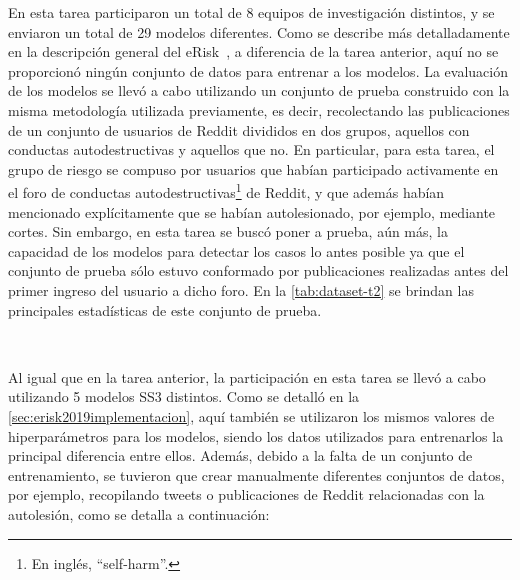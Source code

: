 En esta tarea participaron un total de 8 equipos de investigación distintos, y se enviaron un total de 29 modelos diferentes.
Como se describe más detalladamente en la descripción general del eRisk~\cite{losadaetal2019}, a diferencia de la tarea anterior, aquí no se proporcionó ningún conjunto de datos para entrenar a los modelos.
La evaluación de los modelos se llevó a cabo utilizando un conjunto de prueba construido con la misma metodología utilizada previamente, es decir, recolectando las publicaciones de un conjunto de usuarios de Reddit divididos en dos grupos, aquellos con conductas autodestructivas y aquellos que no.
En particular, para esta tarea, el grupo de riesgo se compuso por usuarios que habían participado activamente en el foro de conductas autodestructivas\footnote{En inglés, ``self-harm''.} de Reddit, y que además habían mencionado explícitamente que se habían autolesionado, por ejemplo, mediante cortes.
Sin embargo, en esta tarea se buscó poner a prueba, aún más, la capacidad de los modelos para detectar los casos lo antes posible ya que el conjunto de prueba sólo estuvo conformado por publicaciones realizadas antes del primer ingreso del usuario a dicho foro. %
En la \autoref{tab:dataset-t2} se brindan las principales estadísticas de este conjunto de prueba.

\

Al igual que en la tarea anterior, la participación en esta tarea se llevó a cabo utilizando 5 modelos SS3 distintos.
Como se detalló en la \autoref{sec:erisk2019implementacion}, aquí también se utilizaron los mismos valores de hiperparámetros para los modelos, siendo los datos utilizados para entrenarlos la principal diferencia entre ellos.
Además, debido a la falta de un conjunto de entrenamiento, se tuvieron que crear manualmente diferentes conjuntos de datos, por ejemplo, recopilando tweets o publicaciones de Reddit relacionadas con la autolesión, como se detalla a continuación:

